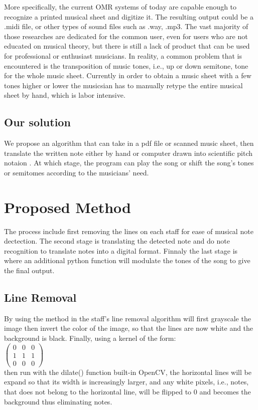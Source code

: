 \documentclass[a4paper,12pt]{report}
\begin{document}
More specifically, the current OMR systems of today are capable enough to
recognize a printed musical sheet and digitize it. The resulting output could be
a .midi file, or other types of sound files such as .way, .mp3. The vast
majority of those researches are dedicated for the common user, even for users
who are not educated on musical theory, but there is still a lack of product
that can be used for professional or enthusiast musicians. In reality, a common
problem that is encountered is the transposition of music tones, i.e., up or down
semitone, tone for the whole music sheet. Currently in order to obtain a music
sheet with a few tones higher or lower the musicsian has to manually retype the
entire musical sheet by hand, which is labor intensive.

\subsection{Our solution}
We propose an algorithm that can take in a pdf file or scanned music sheet, then
translate the written note either by hand or computer drawn into scientific
pitch notaion \cite{Wikipedia2013}.  At which stage, the program can play the
song or shift the song's tones or semitomes according to the musicians' need.

\clearpage

\section{Proposed Method}
The process include first removing the lines on each staff for ease of musical
note dectection.  The second stage is translating the detected note and do note
recognition to translate notes into a digital format. Finnaly the last stage is
where an additional python function will modulate the tones of the song to give
the final output. 


\subsection{Line Removal}
By using the method in \textcite{Gomez2017} the staff's line removal algorithm
will first grayscale the image then invert the color of the image, so that the
lines are now white and the background is black. Finally, using a kernel of the
form: \\
$
\begin{pmatrix}
	0 & 0 & 0\\
	1 & 1 & 1\\
	0 & 0 & 0
\end{pmatrix}
$\\
then run with the dilate() function built-in OpenCV, the horizontal lines will
be expand so that its width is increasingly larger, and any white pixels, i.e.,
notes, that does not belong to the horizontal line, will be flipped to 0 and
becomes the background thus eliminating notes.
\end{document}
